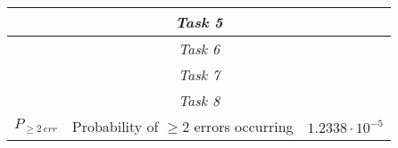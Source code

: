 \begin{center}
\begin{longtable}{|c|c|c|}
    \hline\multicolumn{3}{|c|}{\textit{Task 5}} \\\hline


    \hline\multicolumn{3}{|c|}{\textit{Task 6}} \\\hline


    \hline\multicolumn{3}{|c|}{\textit{Task 7}} \\\hline


    \hline\multicolumn{3}{|c|}{\textit{Task 8}} \\\hline
    $P_{\geq2\,err}$ & Probability of $\geq2$ errors occurring & $ 1.2338\cdot10^{-5} $ \\

    \end{longtable}
\renewcommand{\arraystretch}{1}
\end{center}







\setcounter{secnumdepth}{1}